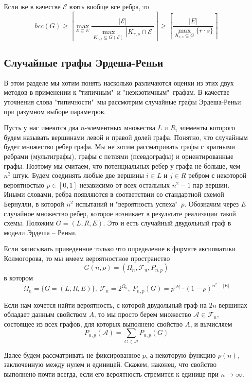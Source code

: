 \documentclass[a4paper]{article}
\begin{document}
Если же в качестве $\mathcal{E}$ взять вообще все ребра, то $$bcc(G) \geq \left\lceil\max\limits_{\mathcal{E}\subseteq E}\frac{|\mathcal{E}|}
{\max\limits_{K_{r,s}\subseteq G(\mathcal{E})}|K_{r,s}\cap\mathcal{E}|}\right\rceil \geq \left\lceil\frac{|E|}
{\max\limits_{K_{r,s}\subseteq G}\{r\cdot s\}}\right\rceil$$


\subsection{Случайные графы Эрдеша-Реньи}
В этом разделе мы хотим понять насколько различаются оценки из этих двух методов в применении к "типичным"\ и
"неэкзотичным"\ графам. В качестве уточнения слова "типичности"\ мы рассмотрим случайные графы Эрдеша-Реньи 
при разумном выборе параметров. 

Пусть у нас имеются два $n$-элементных множества $L$ и $R$, элементы которого будем называть вершинами 
левой и правой долей графа. Понятно, что случайным будет множество ребер графа. Мы не 
хотим рассматривать графы с кратными ребрами (мультиграфы), графы с петлями (псевдографы) и 
ориентированные графы. Поэтому мы считаем, что потенциальных ребер у графа не больше, чем $n^2$ штук. 
Будем соединять любые две вершины $i \in L$ и $j \in R$ ребром с некоторой вероятностью $p\in [0, 1]$ 
независимо от всех остальных $n^2 - 1$ пар вершин. Иными словами, ребра появляются в соответствии со 
стандартной схемой Бернулли, в которой $n^2$ испытаний и "вероятность успеха"\ $p$. Обозначим через $E$
случайное множество ребер, которое возникает в результате реализации такой схемы. Положим $G = (L, R, E)$. 
Это и есть случайный двудольный граф в модели Эрдеша – Реньи. 

Если записывать приведенное только что определение в формате аксиоматики Колмогорова, то мы имеем 
вероятностное пространство $$G(n, p) = (\Omega_n, \mathcal{F}_n, P_{n,p})$$ в котором 
$$\Omega_n = \{G = (L, R, E)\},\ \mathcal{F}_n = 2^{\Omega_n},\ P_{n,p}(G) = p^{|E|}\cdot(1-p)^{n^2 -|E|}$$

Если нам хочется найти вероятность, с которой двудольный граф на $2n$ вершинах обладает данным свойством $A$, 
то мы просто берем множество $\mathcal{A} \in \mathcal{F}_n$, состоящее из всех графов, для которых 
выполнено свойство $A$, и вычисляем $$P_{n,p}(\mathcal{A}) = \sum\limits_{G\in\mathcal{A}}P_{n,p}(G)$$

Далее будем рассматривать не фиксированное $p$, а некоторую функцию $p(n)$, заключенную между нулем и единицей. 
Скажем, наконец, что свойство выполнено почти всегда, если его вероятность стремится к единице при $n \rightarrow \infty$.
\end{document}
